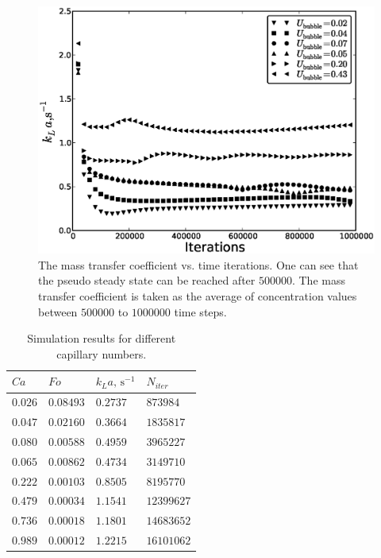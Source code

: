 \documentclass{article}
\begin{document}
\begin{figure}[htb!]
\includegraphics[width=\textwidth]{Figures/steady_state.eps}
\caption{The mass transfer coefficient vs. time iterations. One can see that the pseudo steady
state can be reached after $500000$. The mass transfer coefficient is taken as the average of
concentration values between $500000$ to $1000000$ time steps.\label{fig:steady:state}}
\end{figure}
\begin{table}[htb!]
\begin{tabularx}{\textwidth}{|X|X|X|X|}
\hline
$Ca$&$Fo$&$k_L a,\,\mathrm{s}^{-1}$&$N_{iter}$\\
\hline
$0.026$&$0.08493$&$0.2737$&$873984$\\
$0.047$&$0.02160$&$0.3664$&$1835817$\\
$0.080$&$0.00588$&$0.4959$&$3965227$\\
$0.065$&$0.00862$&$0.4734$&$3149710$\\
$0.222$&$0.00103$&$0.8505$&$8195770$\\
$0.479$&$0.00034$&$1.1541$&$12399627$\\
$0.736$&$0.00018$&$1.1801$&$14683652$\\
$0.989$&$0.00012$&$1.2215$&$16101062$\\
\hline
\end{tabularx}
\caption{Simulation results for different capillary numbers. \label{table:volumetric:coefficients}}
\end{table}
\end{document}
